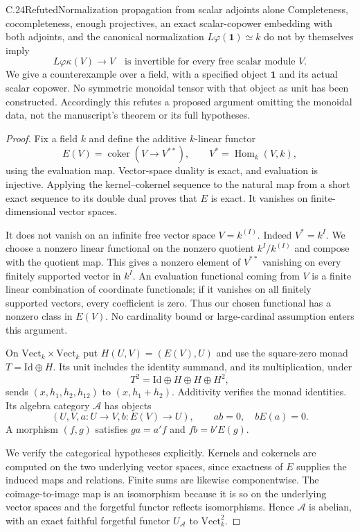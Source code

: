 \begin{claim}{C.24}{Refuted}{Normalization propagation from scalar adjoints alone}\label{C24}
Completeness, cocompleteness, enough projectives, an exact scalar-copower embedding with both adjoints, and the canonical normalization $L\varphi(\mathbf1)\simeq k$ do not by themselves imply
\[
 L\varphi\kappa(V)\longrightarrow V
 \quad\text{is invertible for every free scalar module }V.
\]
We give a counterexample over a field, with a specified object $\mathbf1$ and its actual scalar copower. No symmetric monoidal tensor with that object as unit has been constructed. Accordingly this refutes a proposed argument omitting the monoidal data, not the manuscript's theorem or its full hypotheses.
\end{claim}
\begin{proof}
Fix a field $k$ and define the additive $k$-linear functor
\[
 E(V)=\operatorname{coker}(V\longrightarrow V^{**}),
 \qquad V^*=\operatorname{Hom}_k(V,k),
\]
using the evaluation map. Vector-space duality is exact, and evaluation is injective. Applying the kernel--cokernel sequence to the natural map from a short exact sequence to its double dual proves that $E$ is exact. It vanishes on finite-dimensional vector spaces.

It does not vanish on an infinite free vector space $V=k^{(I)}$. Indeed $V^*=k^I$. We choose a nonzero linear functional on the nonzero quotient $k^I/k^{(I)}$ and compose with the quotient map. This gives a nonzero element of $V^{**}$ vanishing on every finitely supported vector in $k^I$. An evaluation functional coming from $V$ is a finite linear combination of coordinate functionals; if it vanishes on all finitely supported vectors, every coefficient is zero. Thus our chosen functional has a nonzero class in $E(V)$. No cardinality bound or large-cardinal assumption enters this argument.

On $\mathrm{Vect}_k\times\mathrm{Vect}_k$ put $H(U,V)=(E(V),U)$ and use the square-zero monad $T=\mathrm{Id}\oplus H$. Its unit includes the identity summand, and its multiplication, under
\[
 T^2=\mathrm{Id}\oplus H\oplus H\oplus H^2,
\]
sends $(x,h_1,h_2,h_{12})$ to $(x,h_1+h_2)$. Additivity verifies the monad identities. Its algebra category $\mathcal A$ has objects
\[
 (U,V,a:U\to V,b:E(V)\to U),
 \qquad ab=0,\quad bE(a)=0.
\]
A morphism $(f,g)$ satisfies $ga=a'f$ and $fb=b'E(g)$.

We verify the categorical hypotheses explicitly. Kernels and cokernels are computed on the two underlying vector spaces, since exactness of $E$ supplies the induced maps and relations. Finite sums are likewise componentwise. The coimage-to-image map is an isomorphism because it is so on the underlying vector spaces and the forgetful functor reflects isomorphisms. Hence $\mathcal A$ is abelian, with an exact faithful forgetful functor $U_{\mathcal A}$ to $\mathrm{Vect}_k^2$.


\end{proof}
